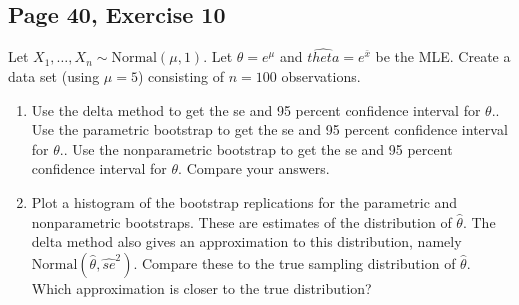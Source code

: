 \documentclass[11pt]{article}
\theoremstyle{definition}
\theoremstyle{remark}
\theoremstyle{remark}
\begin{document}
\subsection{Page 40, Exercise 10}
Let $X_1, \ldots, X_n \sim \mathrm{Normal}(\mu,1)$. Let
$\theta = e^\mu$ and $\hat{theta}=e^{\bar{x}}$ be the MLE. Create a
data set (using $\mu = 5$) consisting of $n = 100$ observations.
\begin{enumerate}[label=\alph*)]
\item Use the delta method to get the se and 95 percent confidence
  interval for $\theta.$. Use the parametric bootstrap to get the se
  and 95 percent confidence interval for $\theta.$. Use the
  nonparametric bootstrap to get the se and 95 percent confidence
  interval for $\theta.$ Compare your answers.
\item Plot a histogram of the bootstrap replications for the
  parametric and nonparametric bootstraps. These are estimates of the
  distribution of $\hat{\theta}$. The delta method also gives an
  approximation to this distribution, namely
  $\mathrm{Normal}(\hat{\theta}, \hat{se}^2)$. Compare these to the
  true sampling distribution of $\hat{\theta}$. Which approximation is
  closer to the true distribution?
\end{enumerate}
\end{document}
